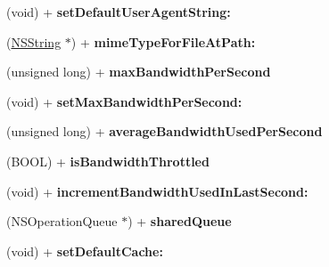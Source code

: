 \begin{DoxyCompactItemize}
\item 
\hypertarget{interface_a_s_i_h_t_t_p_request_a38d3d3f230e39fd9fd9c3060f66f1a2d}{
(void) + {\bfseries set\-Default\-User\-Agent\-String\-:}}
\label{interface_a_s_i_h_t_t_p_request_a38d3d3f230e39fd9fd9c3060f66f1a2d}

\item 
\hypertarget{interface_a_s_i_h_t_t_p_request_af0ff90cbf5e2f4e4b4dc1a7a801dc390}{
(\hyperlink{class_n_s_string}{\-N\-S\-String} $\ast$) + {\bfseries mime\-Type\-For\-File\-At\-Path\-:}}
\label{interface_a_s_i_h_t_t_p_request_af0ff90cbf5e2f4e4b4dc1a7a801dc390}

\item 
\hypertarget{interface_a_s_i_h_t_t_p_request_adbca39932d3860a615003ce57722e134}{
(unsigned long) + {\bfseries max\-Bandwidth\-Per\-Second}}
\label{interface_a_s_i_h_t_t_p_request_adbca39932d3860a615003ce57722e134}

\item 
\hypertarget{interface_a_s_i_h_t_t_p_request_a42d27a50f0bcf03563e1c7b8ac8bfd7d}{
(void) + {\bfseries set\-Max\-Bandwidth\-Per\-Second\-:}}
\label{interface_a_s_i_h_t_t_p_request_a42d27a50f0bcf03563e1c7b8ac8bfd7d}

\item 
\hypertarget{interface_a_s_i_h_t_t_p_request_ae3c70bd7067b067d3e26e846dd776207}{
(unsigned long) + {\bfseries average\-Bandwidth\-Used\-Per\-Second}}
\label{interface_a_s_i_h_t_t_p_request_ae3c70bd7067b067d3e26e846dd776207}

\item 
\hypertarget{interface_a_s_i_h_t_t_p_request_a491d9c50c9e9f3a14a04589182df4ea8}{
(\-B\-O\-O\-L) + {\bfseries is\-Bandwidth\-Throttled}}
\label{interface_a_s_i_h_t_t_p_request_a491d9c50c9e9f3a14a04589182df4ea8}

\item 
\hypertarget{interface_a_s_i_h_t_t_p_request_a0dd9a55c94f4d564a49799a7cfca9cdc}{
(void) + {\bfseries increment\-Bandwidth\-Used\-In\-Last\-Second\-:}}
\label{interface_a_s_i_h_t_t_p_request_a0dd9a55c94f4d564a49799a7cfca9cdc}

\item 
\hypertarget{interface_a_s_i_h_t_t_p_request_a16efdaf7991940011058dda439399f6e}{
(\-N\-S\-Operation\-Queue $\ast$) + {\bfseries shared\-Queue}}
\label{interface_a_s_i_h_t_t_p_request_a16efdaf7991940011058dda439399f6e}

\item 
\hypertarget{interface_a_s_i_h_t_t_p_request_a8672d3dcf5cd0357373034e84e93ee0c}{
(void) + {\bfseries set\-Default\-Cache\-:}}
\label{interface_a_s_i_h_t_t_p_request_a8672d3dcf5cd0357373034e84e93ee0c}


\end{DoxyCompactItemize}
